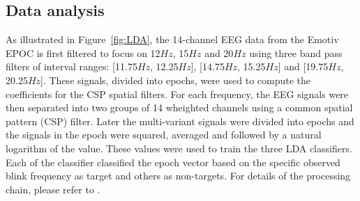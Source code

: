 \documentclass{svmult}
\begin{document}
\subsection{Data analysis}
As illustrated in Figure~\ref{fig:LDA}, the 14-channel EEG data from the Emotiv EPOC is first filtered to focus on 12$Hz$, 15$Hz$ and 20$Hz$ using three band pass filters of interval ranges: [11.75$Hz$, 12.25$Hz$], [14.75$Hz$, 15.25$Hz$] and [19.75$Hz$, 20.25$Hz$]. These signals, divided into epochs, were used to compute the coefficients for the CSP spatial filters. For each frequency, the EEG signals were then separated into two groups of 14 wheighted channels using a common spatial pattern (CSP) filter. Later the multi-variant signals were divided into epochs and the signals in the epoch were squared, averaged and followed by a natural logarithm of the value. These values were used to train the three LDA classifiers. Each of the classifier classified the epoch vector based on the specific observed blink frequency as target and others as non-targets. For details of the processing chain, please refer to \cite{openvibeSSVEP}. 
\end{document}
